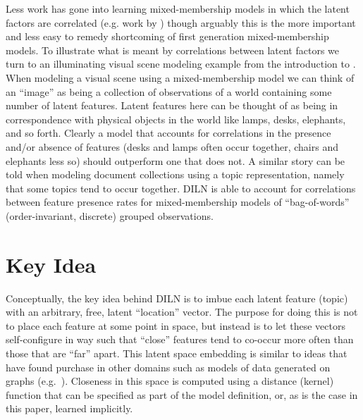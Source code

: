\documentclass[twoside]{article}
\begin{document}
 Less work has gone into learning mixed-membership models in which the latent factors are correlated (e.g. work by \citep{Blei2006b,Li2007,doshivelez2009,rai2009}) though arguably this is the more important and less easy to remedy shortcoming of first generation mixed-membership models.   To illustrate what is meant by correlations between latent factors we turn to an illuminating visual scene modeling example from the introduction to \citep{doshivelez2009}.  When modeling a visual scene using a mixed-membership model we can think of an ``image'' as being a collection of observations of a world containing some number of latent features.  Latent features here can be thought of as being in correspondence with physical objects in the world like lamps, desks, elephants, and so forth.     Clearly a model that accounts for correlations in the presence and/or absence of features (desks and lamps often occur together, chairs and elephants less so) should outperform one that does not.  A similar story can be told when modeling document collections using a topic representation, namely that some topics tend to occur together.  DILN is able to account for correlations between feature presence rates for mixed-membership  models of ``bag-of-words'' (order-invariant, discrete) grouped observations.

\section{Key Idea}

Conceptually, the key idea behind DILN is to imbue each latent feature (topic) with an arbitrary, free, latent ``location'' vector.  The purpose for doing this is not to place each feature at some point in space, but instead is to let these vectors self-configure in way such that ``close'' features tend to co-occur more often than those that are ``far'' apart.  This latent space embedding is similar to ideas that have found purchase in other domains such as models of data generated on graphs (e.g.~\cite{hoff2002}).  Closeness in this space is computed using a distance (kernel) function that can be specified as part of the model definition, or, as is the case in this paper, learned implicitly.

\end{document}
